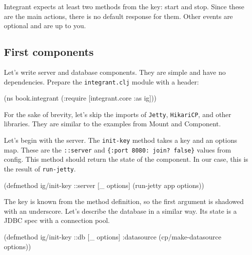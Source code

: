 Integrant expects at least two methods from the key: start and stop. Since these are the main actions, there is no default response for them. Other events are optional and are up to you.

\subsection{First components}


Let's write server and database components. They are simple and have no dependencies. Prepare the \verb|integrant.clj| module with a header:

\begin{english}
  \begin{clojure}
(ns book.integrant
  (:require [integrant.core :as ig]))
  \end{clojure}
\end{english}

For the sake of brevity, let's skip the imports of \verb|Jetty|, \verb|HikariCP|, and other libraries. They are similar to the examples from Mount and Component.

Let's begin with the server. The \verb|init-key| method takes a key and an options map. These are the \verb|::server| and \verb|{:port 8080: join? false}| values from config. This method should return the state of the component. In our case, this is the result of \verb|run-jetty|.

\begin{english}
  \begin{clojure}
(defmethod ig/init-key ::server
  [_ options]
  (run-jetty app options))
  \end{clojure}
\end{english}


The key is known from the method definition, so the first argument is shadowed with an underscore. Let's describe the database in a similar way. Its state is a JDBC spec with a connection pool.

\ifnarrow

\begin{english}
  \begin{clojure}
(defmethod ig/init-key ::db
  [_ options]
  {:datasource
    (cp/make-datasource options)})
  \end{clojure}
\end{english}

